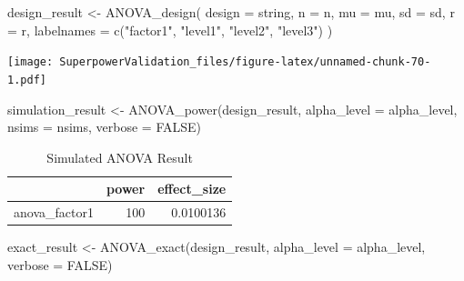 \documentclass[
]{book}
\newenvironment{Shaded}{\begin{snugshade}}{\end{snugshade}}
\newcommand{\AttributeTok}[1]{\textcolor[rgb]{0.77,0.63,0.00}{#1}}
\newcommand{\ConstantTok}[1]{\textcolor[rgb]{0.00,0.00,0.00}{#1}}
\newcommand{\FunctionTok}[1]{\textcolor[rgb]{0.00,0.00,0.00}{#1}}
\newcommand{\NormalTok}[1]{#1}
\newcommand{\OtherTok}[1]{\textcolor[rgb]{0.56,0.35,0.01}{#1}}
\newcommand{\StringTok}[1]{\textcolor[rgb]{0.31,0.60,0.02}{#1}}
\begin{document}
\begin{Shaded}
\begin{Highlighting}[]
\NormalTok{design\_result }\OtherTok{\textless{}{-}} \FunctionTok{ANOVA\_design}\NormalTok{(}
  \AttributeTok{design =}\NormalTok{ string,}
  \AttributeTok{n =}\NormalTok{ n,}
  \AttributeTok{mu =}\NormalTok{ mu,}
  \AttributeTok{sd =}\NormalTok{ sd,}
  \AttributeTok{r =}\NormalTok{ r,}
  \AttributeTok{labelnames =} \FunctionTok{c}\NormalTok{(}\StringTok{"factor1"}\NormalTok{, }\StringTok{"level1"}\NormalTok{, }\StringTok{"level2"}\NormalTok{, }\StringTok{"level3"}\NormalTok{)}
\NormalTok{  )}
\end{Highlighting}
\end{Shaded}

\texttt{[image: SuperpowerValidation\_files/figure-latex/unnamed-chunk-70-1.pdf]}

\begin{Shaded}
\begin{Highlighting}[]
\NormalTok{simulation\_result }\OtherTok{\textless{}{-}} \FunctionTok{ANOVA\_power}\NormalTok{(design\_result,}
                                 \AttributeTok{alpha\_level =}\NormalTok{ alpha\_level,}
                                 \AttributeTok{nsims =}\NormalTok{ nsims,}
                                 \AttributeTok{verbose =} \ConstantTok{FALSE}\NormalTok{)}
\end{Highlighting}
\end{Shaded}

\begin{table}[!h]

\caption{\label{tab:unnamed-chunk-72}Simulated ANOVA Result}
\centering
\begin{tabular}[t]{l|r|r}
\hline
  & power & effect\_size\\
\hline
anova\_factor1 & 100 & 0.0100136\\
\hline
\end{tabular}
\end{table}

\begin{Shaded}
\begin{Highlighting}[]
\NormalTok{exact\_result }\OtherTok{\textless{}{-}} \FunctionTok{ANOVA\_exact}\NormalTok{(design\_result,}
                            \AttributeTok{alpha\_level =}\NormalTok{ alpha\_level,}
                            \AttributeTok{verbose =} \ConstantTok{FALSE}\NormalTok{)}
\end{Highlighting}
\end{Shaded}
\end{document}

